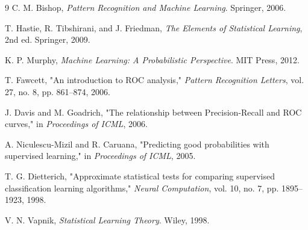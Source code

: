 \documentclass[12pt,a4paper]{article}
\begin{document}
\begin{thebibliography}{9}
C. M. Bishop, \textit{Pattern Recognition and Machine Learning}. Springer, 2006.

T. Hastie, R. Tibshirani, and J. Friedman, \textit{The Elements of Statistical Learning}, 2nd ed. Springer, 2009.

K. P. Murphy, \textit{Machine Learning: A Probabilistic Perspective}. MIT Press, 2012.

T. Fawcett, "An introduction to ROC analysis," \textit{Pattern Recognition Letters}, vol. 27, no. 8, pp. 861--874, 2006.

J. Davis and M. Goadrich, "The relationship between Precision-Recall and ROC curves," in \textit{Proceedings of ICML}, 2006.

A. Niculescu-Mizil and R. Caruana, "Predicting good probabilities with supervised learning," in \textit{Proceedings of ICML}, 2005.

T. G. Dietterich, "Approximate statistical tests for comparing supervised classification learning algorithms," \textit{Neural Computation}, vol. 10, no. 7, pp. 1895--1923, 1998.

V. N. Vapnik, \textit{Statistical Learning Theory}. Wiley, 1998.
\end{thebibliography}
\end{document}
